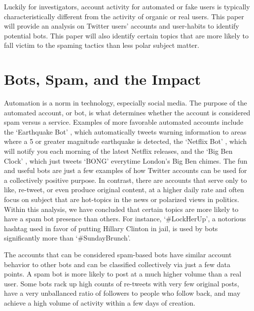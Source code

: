 Luckily for investigators, account activity for automated or fake users is typically characteristically different from the activity of organic or real users. This paper will provide an analysis on Twitter users' accounts and user-habits to identify potential bots. This paper will also identify certain topics that are more likely to fall victim to the spaming tactics than less polar subject matter.

\section{Bots, Spam, and the Impact}

Automation is a norm in technology, especially social media. The purpose of the automated account, or bot, is what determines whether the account is considered spam versus a service. Examples of more favorable automated accounts include the `Earthquake Bot' \cite{earthquakebot}, which automatically tweets warning information to areas where a 5 or greater magnitude earthquake is detected, the `Netflix Bot' \cite{netflix_bot}, which will notify you each morning of the latest Netflix releases, and the `Big Ben Clock' \cite{big_ben_clock}, which just tweets `BONG' everytime London's Big Ben chimes. The fun and useful bots are just a few examples of how Twitter accounts can be used for a collectively positive purpose. In contrast, there are accounts that serve only to like, re-tweet, or even produce original content, at a higher daily rate and often focus on subject that are hot-topics in the news or polarized views in politics. Within this analysis, we have concluded that certain topics are more likely to have a spam bot presence than others. For instance, `\#LockHerUp', a notorious hashtag used in favor of putting Hillary Clinton in jail, is used by bots significantly more than `\#SundayBrunch'.

The accounts that can be considered spam-based bots have similar account behavior to other bots and can be classified collectively via just a few data points. A spam bot is more likely to post at a much higher volume than a real user. Some bots rack up high counts of re-tweets with very few original posts, have a very unballanced ratio of followers to people who follow back, and may achieve a high volume of activity within a few days of creation.

